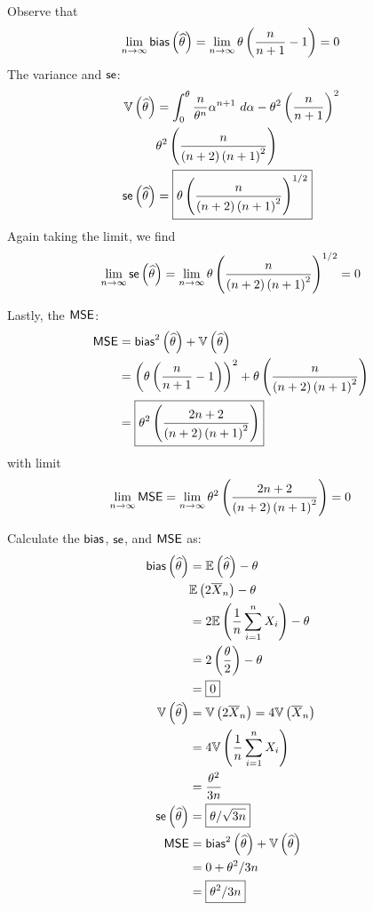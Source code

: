 \documentclass[a4paper]{article}
\begin{document}
Observe that
\[
	\lim_{n \to \infty} \operatorname{\textsf{bias}} \left( \widehat{\theta} \right) = \lim_{n \to \infty} \theta \left( \frac{n}{n+1} - 1 \right) = 0
\]
The variance and \(\operatorname{\textsf{se}}\):
\begin{align*}
	\mathbb{V}\left( \widehat{\theta} \right) & = \int^{\theta}_{0} \frac{n}{\theta^{n}} \alpha^{n+1} \ d \alpha - \theta^{2} \left( \frac{n}{n+1} \right)^{2}  \\
	 & \theta^{2} \left( \frac{n}{\left( n + 2 \right) \left( n + 1 \right)^{2}} \right)  \\
	\operatorname{\textsf{se}} \left( \widehat{\theta} \right) & = \boxed{\theta \left( \frac{n}{\left( n + 2 \right) \left( n + 1 \right)^{2}} \right)^{1/2}}
\end{align*}
Again taking the limit, we find
\[
	\lim_{n \to \infty} \operatorname{\textsf{se}} \left( \widehat{\theta} \right) = \lim_{n \to \infty} \theta \left( \frac{n}{\left( n + 2 \right) \left( n + 1 \right)^{2}} \right)^{1/2} = 0
\]

Lastly, the \(\operatorname{\textsf{MSE}} \):
\begin{align*}
	\operatorname{\textsf{MSE}}  & = \operatorname{\textsf{bias}}^{2} \left( \widehat{\theta} \right) + \mathbb{V}\left( \widehat{\theta} \right) \\
	 & = \left( \theta \left( \frac{n}{n+1} - 1 \right)  \right)^{2} + \theta \left( \frac{n}{\left( n + 2 \right) \left( n + 1 \right)^{2}} \right)  \\ 
	 & = \boxed{\theta^{2} \left( \frac{2n + 2}{\left( n + 2 \right) \left( n + 1 \right)^{2}} \right) }
\end{align*}
with limit
\[
	\lim_{n \to \infty} \operatorname{\textsf{MSE}} = \lim_{n \to \infty} \theta^{2} \left( \frac{2n + 2}{\left( n + 2 \right) \left( n + 1 \right)^{2}} \right) = 0
\]


Calculate the \(\operatorname{\textsf{bias}} \), \(\operatorname{\textsf{se}} \), and \(\operatorname{\textsf{MSE}} \) as:
\begin{align*}
	\operatorname{\textsf{bias}} \left( \widehat{\theta} \right)  & = \mathbb{E}\left( \widehat{\theta} \right) - \theta \\
	 & \mathbb{E}\left( 2 \overline{X}_{n} \right) - \theta \\ 
	 & = 2 \mathbb{E}\left( \frac{1}{n} \sum_{i=1}^{n} X_{i} \right) - \theta \\
	 & = 2 \left( \frac{\theta}{2} \right) - \theta \\
	 & = \boxed{0} \\
	\mathbb{V}\left( \widehat{\theta} \right) & = \mathbb{V}\left( 2 \overline{X}_{n} \right) = 4 \mathbb{V}\left( \overline{X}_{n} \right) \\
	 & = 4 \mathbb{V}\left( \frac{1}{n} \sum_{i=1}^{n} X_{i} \right) \\
	 & = \frac{\theta^{2}}{3n} \\
	\operatorname{\textsf{se}} \left( \widehat{\theta} \right) & = \boxed{\theta / \sqrt{3n}} \\
	\operatorname{\textsf{MSE}} & = \operatorname{\textsf{bias}}^{2} \left( \widehat{\theta} \right) + \mathbb{V}\left( \widehat{\theta} \right) \\
	 & = 0 + \theta^{2} / 3n \\
	 & = \boxed{\theta^{2} / 3n}
\end{align*}
\end{document}
